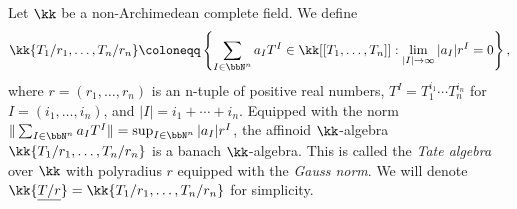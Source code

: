     \begin{example}\label{eg:Tate_algebras_with_Gauss_norm_as_banach_algebras}
        Let \(\kk\) be a non-Archimedean complete field.
        We define
        \[ \kk\{T_1/r_1, \ldots, T_n/r_n\} \coloneqq \left\{\sum_{I \in \bbN^n} a_I T^I \in \kk[[T_1, \ldots, T_n]] : \lim_{|I| \to \infty} |a_I| r^I = 0 \right\}, \]
        where \(r = (r_1, \ldots, r_n)\) is an n-tuple of positive real numbers, \(T^I = T_1^{i_1} \cdots T_n^{i_n}\) for \(I = (i_1, \ldots, i_n)\), and \(|I| = i_1 + \cdots + i_n\).
        Equipped with the norm \(\|\sum_{I \in \bbN^n} a_I T^I\| = \sup_{I \in \bbN^n} |a_I| r^I\), the affinoid \(\kk\)-algebra \(\kk\{T_1/r_1, \ldots, T_n/r_n\}\) is a banach \(\kk\)-algebra.
        This is called the \emph{Tate algebra} over \(\kk\) with polyradius \(r\) equipped with the \emph{Gauss norm}.
        We will denote \(\kk\{\underline{T/r}\} = \kk\{T_1/r_1, \ldots, T_n/r_n\}\) for simplicity.
    \end{example}
